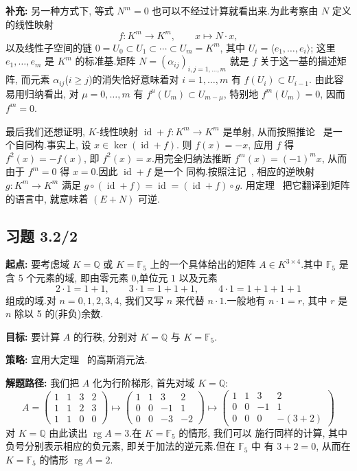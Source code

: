 \noindent\textbf{补充:} 另一种方式下, 等式 $N^m = 0$ 也可以不经过计算就看出来.为此考察由 $N$
定义的线性映射
\[
f \colon K^m \longrightarrow K^m, \qquad x \longmapsto N \cdot x,
\]
以及线性子空间的链 $0 = U_0 \subset U_1 \subset \cdots \subset U_m = K^m$, 其中
$U_i = \langle e_1, \ldots, e_i \rangle$; 这里 $e_1, \ldots, e_m$ 是 $K^m$ 的标准基.矩阵
$N = (\alpha_{ij})_{i, j = 1, \ldots, m}$ 就是 $f$ 关于这一基的描述矩阵, 而元素
$\alpha_{ij}$($i \geq j$)的消失恰好意味着对 $i = 1, \ldots, m$ 有 $f(U_i) \subset U_{i-1}$.
由此容易用归纳看出, 对 $\mu = 0, \ldots, m$ 有 $f^{\mu}(U_m) \subset U_{m - \mu}$, 特别地
$f^m(U_m) = 0$, 因而 $f^m = 0$.

最后我们还想证明, $K$-线性映射 $\operatorname{id} + f \colon K^m \longrightarrow K^m$ 是单射,
从而按照推论~ 是一个自同构.事实上, 设 $x \in \ker(\operatorname{id} + f)$.
则 $f(x) = -x$, 应用 $f$ 得 $f^2(x) = -f(x)$, 即 $f^2(x) = x$.用完全归纳法推断
$f^m(x) = (-1)^m x$, 从而由于 $f^m = 0$ 得 $x = 0$.因此 $\operatorname{id} + f$ 是一个
同构.按照注记~, 相应的逆映射 $g \colon K^m \longrightarrow K^m$ 满足
$g \circ (\operatorname{id} + f) = \operatorname{id} = (\operatorname{id} + f) \circ g$.
用定理~ 把它翻译到矩阵的语言中, 就意味着 $(E + N)$ 可逆.

\subsection*{习题 3.2/2}

\noindent\textbf{起点:} 要考虑域 $K = \mathbb{Q}$ 或 $K = \mathbb{F}_5$ 上的一个具体给出的矩阵
$A \in K^{3 \times 4}$.其中 $\mathbb{F}_5$ 是含 5 个元素的域, 即由零元素 $0$,单位元 $1$
以及元素
\[
2 \cdot 1 = 1 + 1, \qquad 3 \cdot 1 = 1 + 1 + 1, \qquad 4 \cdot 1 = 1 + 1 + 1 + 1
\]
组成的域.对 $n = 0, 1, 2, 3, 4$, 我们又写 $n$ 来代替 $n \cdot 1$.一般地有 $n \cdot 1 = r$,
其中 $r$ 是 $n$ 除以 5 的(非负)余数.

\noindent\textbf{目标:} 要计算 $A$ 的行秩, 分别对 $K = \mathbb{Q}$ 与 $K = \mathbb{F}_5$.

\noindent\textbf{策略:} 宜用大定理~ 的高斯消元法.

\noindent\textbf{解题路径:} 我们把 $A$ 化为行阶梯形, 首先对域 $K = \mathbb{Q}$:
\[
A = \begin{pmatrix} 1 & 1 & 3 & 2 \\ 1 & 1 & 2 & 3 \\ 1 & 1 & 0 & 0 \end{pmatrix}
\longmapsto \begin{pmatrix} 1 & 1 & 3 & 2 \\ 0 & 0 & -1 & 1 \\ 0 & 0 & -3 & -2 \end{pmatrix}
\longmapsto \begin{pmatrix} 1 & 1 & 3 & 2 \\ 0 & 0 & -1 & 1 \\ 0 & 0 & 0 & -(3 + 2) \end{pmatrix}
\]
对 $K = \mathbb{Q}$ 由此读出 $\operatorname{rg} A = 3$.在 $K = \mathbb{F}_5$ 的情形, 我们可以
施行同样的计算, 其中负号分别表示相应的负元素, 即关于加法的逆元素.但在 $\mathbb{F}_5$ 中
有 $3 + 2 = 0$, 从而在 $K = \mathbb{F}_5$ 的情形 $\operatorname{rg} A = 2$.

